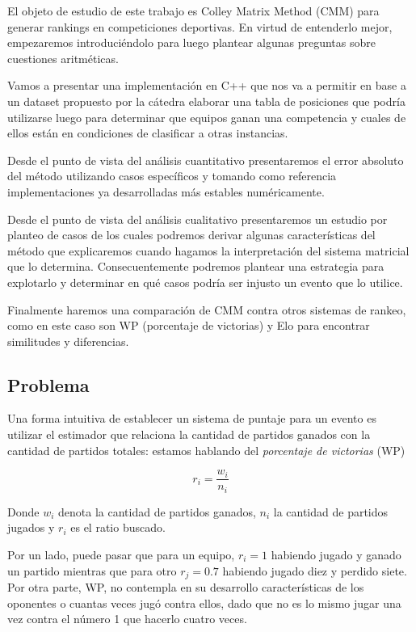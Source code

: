 El objeto de estudio de este trabajo es Colley Matrix Method (CMM) para generar rankings en competiciones deportivas. En virtud de entenderlo mejor, empezaremos introduciéndolo para luego plantear algunas preguntas sobre cuestiones aritméticas.

Vamos a presentar una implementación en C++ que nos va a permitir en base a un dataset propuesto por la cátedra elaborar una tabla de posiciones que podría utilizarse luego para determinar que equipos ganan una competencia y cuales de ellos están en condiciones de clasificar a otras instancias.

Desde el punto de vista del análisis cuantitativo presentaremos el error absoluto del método utilizando casos específicos y tomando como referencia implementaciones ya desarrolladas más estables numéricamente.

Desde el punto de vista del análisis cualitativo presentaremos un estudio por planteo de casos de los cuales podremos derivar algunas características del método que explicaremos cuando hagamos la interpretación del sistema matricial que lo determina. Consecuentemente podremos plantear una estrategia para explotarlo y determinar en qué casos podría ser injusto un evento que lo utilice.

Finalmente haremos una comparación de CMM contra otros sistemas de rankeo, como en este caso son WP (porcentaje de victorias) y Elo para encontrar similitudes y diferencias.

\subsection{Problema}
Una forma intuitiva de establecer un sistema de puntaje para un evento es utilizar el estimador que relaciona la cantidad de partidos ganados con la cantidad de partidos totales: estamos hablando del \textit{porcentaje de victorias} (WP)

\begin{equation}
    r_i = \frac{w_i}{n_i}
\end{equation}

Donde $w_i$ denota la cantidad de partidos ganados, $n_i$ la cantidad de partidos jugados y $r_i$ es el ratio buscado.

Por un lado, puede pasar que para un equipo, $r_i = 1$ habiendo jugado y ganado un partido mientras que para otro $r_j = 0.7$ habiendo jugado diez y perdido siete. Por otra parte, WP, no contempla en su desarrollo características de los oponentes o cuantas veces jugó contra ellos, dado que no es lo mismo jugar una vez contra el número 1 que hacerlo cuatro veces.

